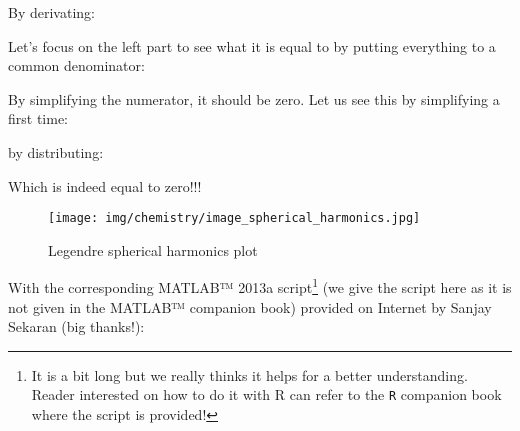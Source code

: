 	By derivating:
	
	Let's focus on the left part to see what it is equal to by putting everything to a common denominator:
	
	By simplifying the numerator, it should be zero. Let us see this by simplifying a first time:
	
	by distributing:
	
	Which is indeed equal to zero!!!
 	\begin{figure}[H]
		\centering
		\texttt{[image: img/chemistry/image\_spherical\_harmonics.jpg]}	
		\caption{Legendre spherical harmonics plot}
	\end{figure}
	With the corresponding MATLAB™ 2013a script\footnote{It is a bit long but we really thinks it helps for a better understanding. Reader interested on how to do it with R can refer to the \texttt{R} companion book where the script is provided!} (we give the script here as it is not given in the MATLAB™ companion book) provided on Internet by Sanjay Sekaran (big thanks!):
